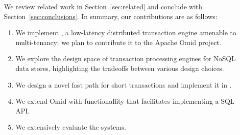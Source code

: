 
We review related work in Section~\ref{sec:related} and conclude with Section~\ref{sec:conclusions}.
In summary, our contributions are as follows:
\begin{enumerate}
    \setlength{\itemsep}{1pt}
    \setlength{\parskip}{1pt}
    \setlength{\parsep}{1pt}  
\item We implement \sysll, a low-latency distributed transaction engine amenable to multi-tenancy; 
we plan to contribute it  to the Apache Omid project.
\item We explore the design space of transaction processing engines for NoSQL data stores, 
highlighting the tradeoffs between various design choices.  
\item We design a novel fast path for short transactions and implement it in \sys.
\item We extend Omid with functionallity that facilitates implementing a SQL API. 
\item We extensively evaluate the systems.
\end{enumerate}